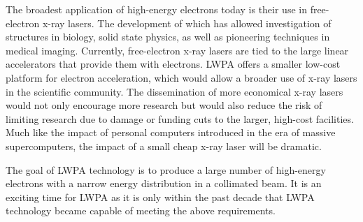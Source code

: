 \documentclass[12pt,letter]{article}
\begin{document}
 
 The broadest application of high-energy electrons today is their use in
 free-electron x-ray lasers. The development of
 which has allowed investigation of structures in biology, solid state
 physics, as well as pioneering techniques in medical
 imaging\cite{o2001free,pellegrini2003x}.
 Currently, free-electron x-ray lasers are tied to the large linear accelerators that provide them
 with electrons. LWPA offers a smaller low-cost platform for electron
 acceleration, which would allow a broader use of x-ray lasers in the
 scientific community.  The dissemination of more economical x-ray
 lasers would not only encourage more research but would also reduce the risk of
 limiting research due to damage or funding cuts to the larger, high-cost
 facilities. Much like the impact of personal
 computers introduced in the era of massive supercomputers, the impact of a
 small cheap x-ray laser  will be dramatic\cite{mcneil2010x}. 


 The goal of LWPA technology is to produce
 a large number of high-energy electrons with a narrow energy distribution in a collimated beam.
It is an exciting
 time for LWPA as it is only
 within the past decade that LWPA technology became capable of meeting the above
 requirements. 
\end{document}
